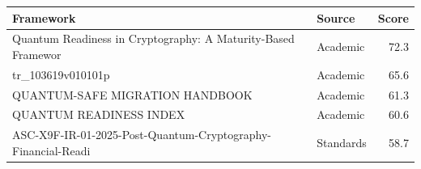 \begin{tabular}{llr}
\toprule
Framework & Source & Score \\
\midrule
Quantum Readiness in Cryptography: A Maturity-Based Framewor & Academic & 72.3 \\
tr_103619v010101p & Academic & 65.6 \\
QUANTUM-SAFE MIGRATION HANDBOOK & Academic & 61.3 \\
QUANTUM READINESS INDEX & Academic & 60.6 \\
ASC-X9F-IR-01-2025-Post-Quantum-Cryptography-Financial-Readi & Standards & 58.7 \\
\bottomrule
\end{tabular}
